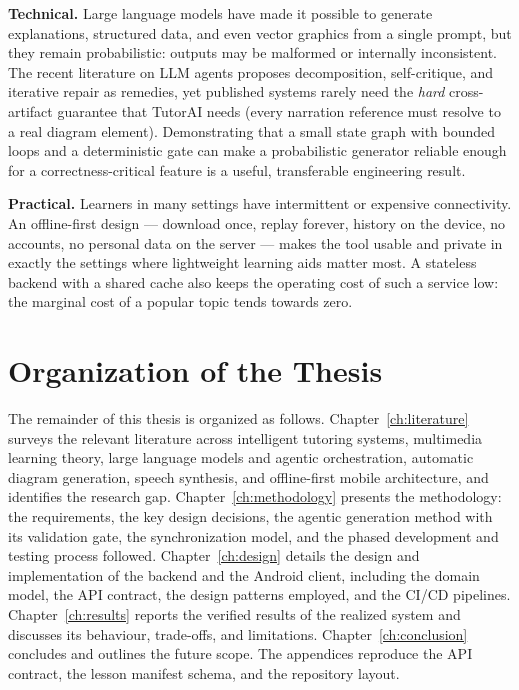 \textbf{Technical.} Large language models have made it possible to generate
explanations, structured data, and even vector graphics from a single prompt,
but they remain probabilistic: outputs may be malformed or internally
inconsistent. The recent literature on LLM agents proposes decomposition,
self-critique, and iterative repair as remedies, yet published systems rarely
need the \emph{hard} cross-artifact guarantee that TutorAI needs (every
narration reference must resolve to a real diagram element). Demonstrating
that a small state graph with bounded loops and a deterministic gate can make
a probabilistic generator reliable enough for a correctness-critical feature
is a useful, transferable engineering result.

\textbf{Practical.} Learners in many settings have intermittent or expensive
connectivity. An offline-first design --- download once, replay forever,
history on the device, no accounts, no personal data on the server --- makes
the tool usable and private in exactly the settings where lightweight learning
aids matter most. A stateless backend with a shared cache also keeps the
operating cost of such a service low: the marginal cost of a popular topic
tends towards zero.

\section{Organization of the Thesis}
\label{sec:organization}

The remainder of this thesis is organized as follows.
Chapter~\ref{ch:literature} surveys the relevant literature across
intelligent tutoring systems, multimedia learning theory, large language
models and agentic orchestration, automatic diagram generation, speech
synthesis, and offline-first mobile architecture, and identifies the research
gap. Chapter~\ref{ch:methodology} presents the methodology: the requirements,
the key design decisions, the agentic generation method with its validation
gate, the synchronization model, and the phased development and testing
process followed. Chapter~\ref{ch:design} details the design and
implementation of the backend and the Android client, including the domain
model, the API contract, the design patterns employed, and the CI/CD
pipelines. Chapter~\ref{ch:results} reports the verified results of the
realized system and discusses its behaviour, trade-offs, and limitations.
Chapter~\ref{ch:conclusion} concludes and outlines the future scope. The
appendices reproduce the API contract, the lesson manifest schema, and the
repository layout.
